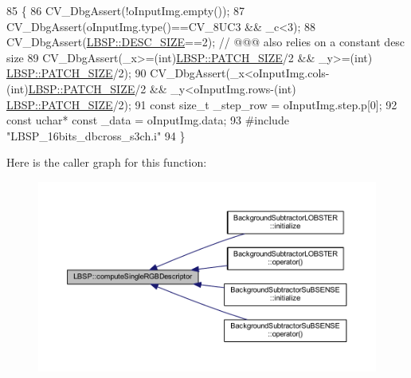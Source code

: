 \begin{DoxyCode}
85                                                                                                            
                                                                   \{
86         CV\_DbgAssert(!oInputImg.empty());
87         CV\_DbgAssert(oInputImg.type()==CV\_8UC3 && \_c<3);
88         CV\_DbgAssert(\mbox{\hyperlink{class_l_b_s_p_a11167130ddc713921e5bbb0b628d5f74}{LBSP::DESC\_SIZE}}==2); \textcolor{comment}{// @@@ also relies on a constant desc size}
89         CV\_DbgAssert(\_x>=(\textcolor{keywordtype}{int})\mbox{\hyperlink{class_l_b_s_p_aa98abb79a155d3a2b416c2ab32e74929}{LBSP::PATCH\_SIZE}}/2 && \_y>=(\textcolor{keywordtype}{int})
      \mbox{\hyperlink{class_l_b_s_p_aa98abb79a155d3a2b416c2ab32e74929}{LBSP::PATCH\_SIZE}}/2);
90         CV\_DbgAssert(\_x<oInputImg.cols-(\textcolor{keywordtype}{int})\mbox{\hyperlink{class_l_b_s_p_aa98abb79a155d3a2b416c2ab32e74929}{LBSP::PATCH\_SIZE}}/2 && \_y<oInputImg.rows-(\textcolor{keywordtype}{int})
      \mbox{\hyperlink{class_l_b_s_p_aa98abb79a155d3a2b416c2ab32e74929}{LBSP::PATCH\_SIZE}}/2);
91         \textcolor{keyword}{const} \textcolor{keywordtype}{size\_t} \_step\_row = oInputImg.step.p[0];
92         \textcolor{keyword}{const} uchar* \textcolor{keyword}{const} \_data = oInputImg.data;
93 \textcolor{preprocessor}{        #include "LBSP\_16bits\_dbcross\_s3ch.i"}
94     \}
\end{DoxyCode}
Here is the caller graph for this function\+:\nopagebreak
\begin{figure}[H]
\begin{center}
\leavevmode
\includegraphics[width=350pt]{class_l_b_s_p_a35f2abfacc0d540810d678ff5e8cd619_icgraph}
\end{center}
\end{figure}
\mbox{\label{class_l_b_s_p_afc7aa065fa562edd2b16b766910e7806}} 

